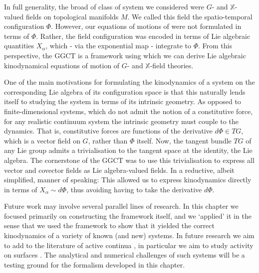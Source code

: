 In full generality, the broad of class of system we considered were $G$- and $\mathbb{X}$-valued fields on topological manifolds $M$. We called this field the spatio-temporal configuration $\Phi$. However, our equations of motions of were not formulated in terms of $\Phi$. Rather, the field configuration was encoded in terms of Lie algebraic quantities $X_\alpha$, which - via the exponential map - integrate to $\Phi$. From this perspective, the GGCT is a framework using which we can derive Lie algebraic kinodynamical equations of motion of $G$- and $\mathbb{X}$-field theories.

One of the main motivations for formulating the kinodynamics of a system on the corresponding Lie algebra of its configuration space is that this naturally lends itself to studying the system in terms of its intrinsic geometry. As opposed to finite-dimensional systems, which do not admit the notion of a constitutive force, for any realistic continuum system the intrinsic geometry must couple to the dynamics. That is, constitutive forces are functions of the derivative $d \Phi \in TG$, which is a vector field on $G$, rather than $\Phi$ itself. Now, the tangent bundle $TG$ of any Lie group admits a trivialisation to the tangent space at the identity, the Lie algebra. The cornerstone of the GGCT was to use this trivialisation to express all vector and covector fields as Lie algebra-valued fields. In a reductive, albeit simplified, manner of speaking: This allowed us to express kinodynamics directly in terms of $X_\alpha \sim d \Phi$, thus avoiding having to take the derivative $d \Phi$.

Future work may involve several parallel lines of research. In this chapter we focused primarily on constructing the framework itself, and we `applied' it in the sense that we used the framework to show that it yielded the correct kinodynamics of a variety of known (and new) systems. In future research we aim to add to the literature of active continua \citep{laskarBrownianMicrohydrodynamicsActive2015, laskarFilamentActuationActive2017, kaczmarskiActiveFilamentsCurvature2022, pandeyFlowinducedNonequilibriumSelfassembly2016}, in particular we aim to study activity on surfaces \citep{krishnaswamyCosserattypeModelRed1996, rangamaniSmallScaleMembrane2014, ericksenLiquidCrystalsCosserat1974, powersDynamicsFilamentsMembranes2010}. The analytical and numerical challenges of such systems will be a testing ground for the formalism developed in this chapter.

